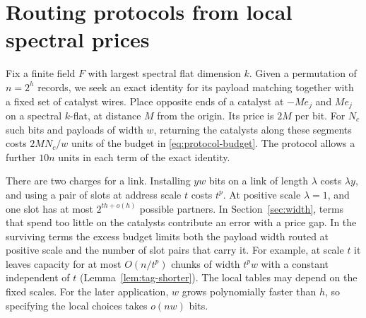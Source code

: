 \section{Routing protocols from local spectral prices}\label{sec:protocol}

Fix a finite field $F$ with largest spectral flat dimension $k$.
Given a permutation of $n=2^h$ records, we seek an exact identity
for its payload matching together with a fixed set of catalyst wires.
Place opposite ends of a catalyst at $-Me_j$ and $Me_j$ on a spectral
$k$-flat, at distance $M$ from the origin. Its price is $2M$ per bit.
For $N_c$ such bits and payloads of width $w$, returning the catalysts
along these segments costs $2MN_c/w$ units of the budget in \eqref{eq:protocol-budget}. The protocol allows a further
$10n$ units in each term of the exact identity.

There are two charges for a link. Installing $yw$ bits on a link of
length $\lambda$ costs $\lambda y$, and using a pair of slots at
address scale $t$ costs $t^p$. At positive scale $\lambda=1$, and
one slot has at most $2^{th+o(h)}$ possible partners. In
Section~\ref{sec:width}, terms that spend too little on the
catalysts contribute an error with a price gap. In the surviving
terms the excess budget limits both the payload width routed at
positive scale and the number of slot pairs that carry it. For
example, at scale $t$ it leaves capacity for at most $O(n/t^p)$ chunks of width $t^p w$
with a constant independent of $t$ (Lemma~\ref{lem:tag-shorter}).
The local tables may depend on the fixed scales. For the later
application, $w$ grows polynomially faster than $h$, so specifying
the local choices takes $o(nw)$ bits.


